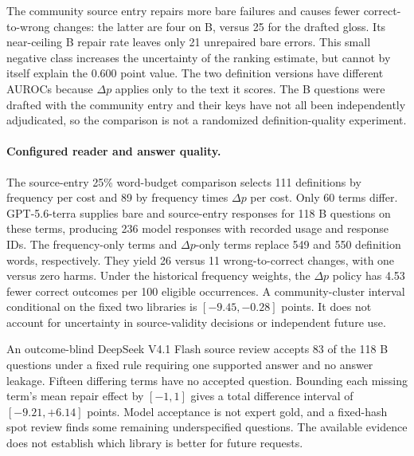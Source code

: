 The community source entry repairs more bare failures and causes fewer correct-to-wrong changes: the latter are four on B, versus 25 for the drafted gloss. Its near-ceiling B repair rate leaves only 21 unrepaired bare errors. This small negative class increases the uncertainty of the ranking estimate, but cannot by itself explain the 0.600 point value. The two definition versions have different AUROCs because $\Delta p$ applies only to the text it scores. The B questions were drafted with the community entry and their keys have not all been independently adjudicated, so the comparison is not a randomized definition-quality experiment.

\paragraph{Configured reader and answer quality.}
The source-entry 25\% word-budget comparison selects 111 definitions by frequency per cost and 89 by frequency times $\Delta p$ per cost. Only 60 terms differ. GPT-5.6-terra supplies bare and source-entry responses for 118 B questions on these terms, producing 236 model responses with recorded usage and response IDs. The frequency-only terms and $\Delta p$-only terms replace 549 and 550 definition words, respectively. They yield 26 versus 11 wrong-to-correct changes, with one versus zero harms. Under the historical frequency weights, the $\Delta p$ policy has 4.53 fewer correct outcomes per 100 eligible occurrences. A community-cluster interval conditional on the fixed two libraries is $[-9.45,-0.28]$ points. It does not account for uncertainty in source-validity decisions or independent future use.

An outcome-blind DeepSeek V4.1 Flash source review accepts 83 of the 118 B questions under a fixed rule requiring one supported answer and no answer leakage. Fifteen differing terms have no accepted question. Bounding each missing term's mean repair effect by $[-1,1]$ gives a total difference interval of $[-9.21,+6.14]$ points. Model acceptance is not expert gold, and a fixed-hash spot review finds some remaining underspecified questions. The available evidence does not establish which library is better for future requests.
